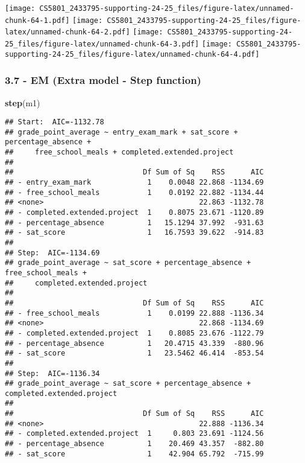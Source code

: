 \documentclass[
]{article}
\newenvironment{Shaded}{\begin{snugshade}}{\end{snugshade}}
\newcommand{\FunctionTok}[1]{\textcolor[rgb]{0.13,0.29,0.53}{\textbf{#1}}}
\newcommand{\NormalTok}[1]{#1}
\begin{document}
\texttt{[image: CS5801\_2433795-supporting-24-25\_files/figure-latex/unnamed-chunk-64-1.pdf]}
\texttt{[image: CS5801\_2433795-supporting-24-25\_files/figure-latex/unnamed-chunk-64-2.pdf]}
\texttt{[image: CS5801\_2433795-supporting-24-25\_files/figure-latex/unnamed-chunk-64-3.pdf]}
\texttt{[image: CS5801\_2433795-supporting-24-25\_files/figure-latex/unnamed-chunk-64-4.pdf]}

\subsubsection{3.7 - EM (Extra model - Step
function)}\label{em-extra-model---step-function}

\begin{Shaded}
\begin{Highlighting}[]
\FunctionTok{step}\NormalTok{(m1)}
\end{Highlighting}
\end{Shaded}

\begin{verbatim}
## Start:  AIC=-1132.78
## grade_point_average ~ entry_exam_mark + sat_score + percentage_absence + 
##     free_school_meals + completed.extended.project
## 
##                              Df Sum of Sq    RSS      AIC
## - entry_exam_mark             1    0.0048 22.868 -1134.69
## - free_school_meals           1    0.0192 22.882 -1134.44
## <none>                                    22.863 -1132.78
## - completed.extended.project  1    0.8075 23.671 -1120.89
## - percentage_absence          1   15.1294 37.992  -931.63
## - sat_score                   1   16.7593 39.622  -914.83
## 
## Step:  AIC=-1134.69
## grade_point_average ~ sat_score + percentage_absence + free_school_meals + 
##     completed.extended.project
## 
##                              Df Sum of Sq    RSS      AIC
## - free_school_meals           1    0.0199 22.888 -1136.34
## <none>                                    22.868 -1134.69
## - completed.extended.project  1    0.8085 23.676 -1122.79
## - percentage_absence          1   20.4715 43.339  -880.96
## - sat_score                   1   23.5462 46.414  -853.54
## 
## Step:  AIC=-1136.34
## grade_point_average ~ sat_score + percentage_absence + completed.extended.project
## 
##                              Df Sum of Sq    RSS      AIC
## <none>                                    22.888 -1136.34
## - completed.extended.project  1     0.803 23.691 -1124.56
## - percentage_absence          1    20.469 43.357  -882.80
## - sat_score                   1    42.904 65.792  -715.99
\end{verbatim}
\end{document}
